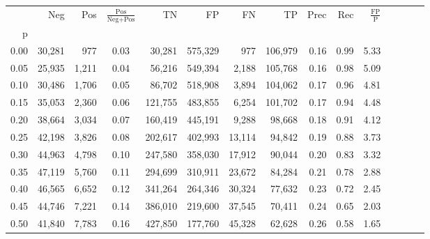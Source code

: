 \begin{tabular}{rrrcrrrrrrrrrrr}
\toprule
{} &     Neg &    Pos & $\frac{\text{Pos}}{\text{Neg}+\text{Pos}}$ &       TN &       FP &       FN &       TP &  Prec &   Rec & $\frac{\text{FP}}{\text{P}}$ \\
p    &         &        &                                            &          &          &          &          &       &       &                              \\
\midrule
0.00 &  30,281 &    977 &                                       0.03 &   30,281 &  575,329 &      977 &  106,979 &  0.16 &  0.99 &                         5.33 \\
0.05 &  25,935 &  1,211 &                                       0.04 &   56,216 &  549,394 &    2,188 &  105,768 &  0.16 &  0.98 &                         5.09 \\
0.10 &  30,486 &  1,706 &                                       0.05 &   86,702 &  518,908 &    3,894 &  104,062 &  0.17 &  0.96 &                         4.81 \\
0.15 &  35,053 &  2,360 &                                       0.06 &  121,755 &  483,855 &    6,254 &  101,702 &  0.17 &  0.94 &                         4.48 \\
0.20 &  38,664 &  3,034 &                                       0.07 &  160,419 &  445,191 &    9,288 &   98,668 &  0.18 &  0.91 &                         4.12 \\
0.25 &  42,198 &  3,826 &                                       0.08 &  202,617 &  402,993 &   13,114 &   94,842 &  0.19 &  0.88 &                         3.73 \\
0.30 &  44,963 &  4,798 &                                       0.10 &  247,580 &  358,030 &   17,912 &   90,044 &  0.20 &  0.83 &                         3.32 \\
0.35 &  47,119 &  5,760 &                                       0.11 &  294,699 &  310,911 &   23,672 &   84,284 &  0.21 &  0.78 &                         2.88 \\
0.40 &  46,565 &  6,652 &                                       0.12 &  341,264 &  264,346 &   30,324 &   77,632 &  0.23 &  0.72 &                         2.45 \\
0.45 &  44,746 &  7,221 &                                       0.14 &  386,010 &  219,600 &   37,545 &   70,411 &  0.24 &  0.65 &                         2.03 \\
0.50 &  41,840 &  7,783 &                                       0.16 &  427,850 &  177,760 &   45,328 &   62,628 &  0.26 &  0.58 &                         1.65 \\

\end{tabular}
